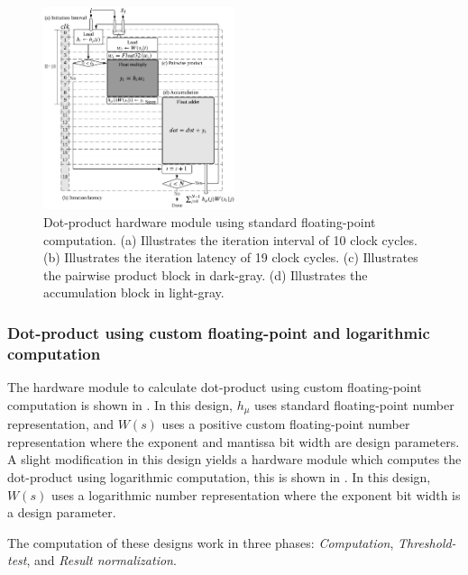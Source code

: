 \begin{figure}[t!]
	\centering
	\includegraphics[width=0.5\textwidth]{../figures/dot_product_float.pdf}
	\caption{Dot-product hardware module using standard floating-point computation. (a) Illustrates the iteration interval of 10 clock cycles. (b) Illustrates the iteration latency of 19 clock cycles. (c) Illustrates the pairwise product block in dark-gray. (d) Illustrates the accumulation block in light-gray.}
	\label{fig:dot_product_float}
\end{figure}

\subsubsection{Dot-product using custom floating-point and logarithmic computation}
 The hardware module to calculate dot-product using custom floating-point computation is shown in . In this design, $h_\mu$ uses standard floating-point number representation, and $W(s)$ uses a positive custom floating-point number representation where the exponent and mantissa bit width are design parameters. A slight modification in this design yields a hardware module which computes the dot-product using logarithmic computation, this is shown in . In this design, $W(s)$ uses a logarithmic number representation where the exponent bit width is a design parameter.
 
 The computation of these designs work in three phases: \emph{Computation}, \emph{Threshold-test}, and \emph{Result normalization}.
 
